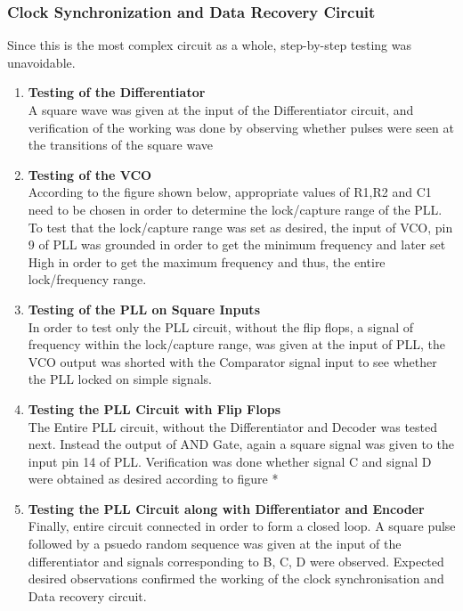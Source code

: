 \documentclass{article}
\begin{document}
\subsubsection{Clock Synchronization and Data Recovery Circuit}
Since this is the most complex circuit as a whole, step-by-step testing was unavoidable.
\begin{enumerate}[label=(\alph*)]
\item \textbf{Testing of the Differentiator}\\ A square wave was given at the input of the Differentiator circuit, and verification of the working was done by observing whether pulses were seen at the transitions of the square wave 
\item \textbf{Testing of the VCO}\\ According to the figure shown below, appropriate values of R1,R2 and C1 need to be chosen in order to determine the lock/capture range of the PLL. To test that the lock/capture range was set as desired, the input of VCO, pin 9 of PLL was grounded in order to get the minimum frequency and later set High in order to get the maximum frequency and thus, the entire lock/frequency range.
\item \textbf{Testing of the PLL on Square Inputs}\\ In order to test only the PLL circuit, without the flip flops, a signal of frequency within the lock/capture range, was given at the input of PLL, the VCO output was shorted with the Comparator signal input to see whether the PLL locked on simple signals.
\item \textbf{Testing the PLL Circuit with Flip Flops}\\ The Entire PLL circuit, without the Differentiator and Decoder was tested next. Instead the output of AND Gate, again a square signal was given to the input pin 14 of PLL. Verification was done whether signal C and signal D were obtained as desired according to figure *
\item \textbf{Testing the PLL Circuit along with Differentiator and  Encoder} \\ Finally, entire circuit connected in order to form a closed loop. A square pulse followed by a psuedo random sequence was given at the input of the differentiator and signals corresponding to B, C, D were observed. Expected desired observations confirmed the working of the clock synchronisation and Data recovery circuit.
\end{enumerate}
\end{document}
